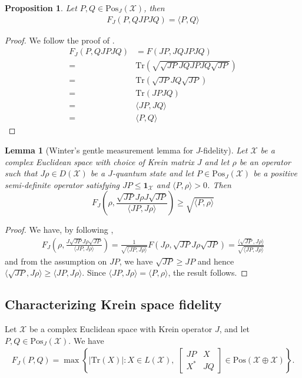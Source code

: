 \documentclass{amsart}
\numberwithin{equation}{section}
\newtheorem{lemma}[theorem]{Lemma}
\newtheorem{proposition}[theorem]{Proposition}
\theoremstyle{definition}
\theoremstyle{plain}
\theoremstyle{solutionstyle}
\begin{document}
\begin{proposition}
    Let $P,Q \in\mathrm{Pos}_J(\mathcal{X})$, then 
    \begin{align*}
        F_J(P,QJPJQ)=\langle P,Q \rangle
    \end{align*}
\end{proposition}
 \begin{proof} We follow the proof of \cite[pp.~142--143]{Watrous_2018}.
     \begin{align*}
     F_J(P,QJPJQ)&=F(JP,JQJPJQ)\\
     =&\mathrm{Tr}\left(\sqrt{\sqrt{JP}JQJPJQ\sqrt{JP}}\right)\\
     =&\mathrm{Tr}\left(\sqrt{JP}JQ\sqrt{JP}\right)\\
     =&\mathrm{Tr}(JPJQ)\\
     =&\langle JP, JQ\rangle\\
     =& \langle P,Q\rangle
     \end{align*}
 \end{proof}
\begin{lemma}[Winter's gentle measurement lemma for $J$-fidelity]
Let $\mathcal{X}$ be a complex Euclidean space with choice of Krein matrix $J$ and let $\rho$ be an operator such that $J\rho\in D(\mathcal{X})$ be a $J$-quantum state and let $P\in \mathrm{Pos}_J(\mathcal{X})$ be a positive semi-definite operator satisfying $JP\leq \mathbf{1}_{\mathcal{X}}$ and $\langle P,\rho\rangle>0$. Then
\begin{equation*}F_J\left(\rho, \frac{\sqrt{JP}J\rho J\sqrt{JP}}{\langle JP, J\rho\rangle}\right)\geq \sqrt{\langle P, \rho\rangle} \end{equation*}
\end{lemma}
\begin{proof}
    We have, by following \cite[p.~143]{Watrous_2018},
    \begin{align*}
        F_J\left(\rho,\frac{J\sqrt{JP}J\rho \sqrt{JP}}{\langle JP,J\rho\rangle}\right)=\frac{1}{\sqrt{\langle JP,J\rho\rangle}}F(J\rho, \sqrt{JP}J\rho \sqrt{JP})=\frac{\langle \sqrt{JP},J\rho\rangle}{\sqrt{\langle JP, J\rho\rangle}}
    \end{align*}
    and from the assumption on $JP$, we have $\sqrt{JP}\geq JP$ and hence $\langle \sqrt{JP}, J\rho\rangle\geq \langle JP, J\rho\rangle$. Since $\langle JP,J\rho\rangle =\langle P, \rho \rangle$, the result follows.
\end{proof}


\subsection{Characterizing Krein space fidelity}
Let $\mathcal{X}$ be a complex Euclidean space with Krein operator $J$, and let $P, Q \in \mathrm{Pos}_J(\mathcal{X})$. We have
\begin{align*}
    F_J(P,Q)
    = \max \left\{ \left| \mathrm{Tr}(X) \right| : X \in L(\mathcal{X}), \;
    \begin{bmatrix}
        JP & X \\
        X^{*} & JQ
    \end{bmatrix}
     \in \mathrm{Pos}(\mathcal{X}\oplus\mathcal{X})
    \right\}.
\end{align*}
\end{document}
